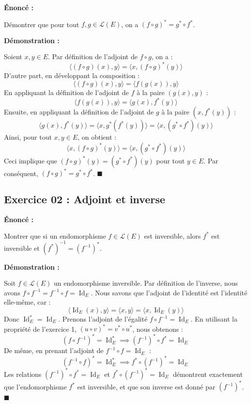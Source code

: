 \documentclass[11pt,a4paper]{article}
\begin{document}
\textbf{Énoncé :}


Démontrer que pour tout $f, g \in \mathcal{L}(E)$, on a $(f \circ g)^* = g^* \circ f^*$.

\textbf{Démonstration :}


Soient $x, y \in E$. Par définition de l'adjoint de $f \circ g$, on a :
$$ \langle (f \circ g)(x), y \rangle = \langle x, (f \circ g)^*(y) \rangle $$
D'autre part, en développant la composition :
$$ \langle (f \circ g)(x), y \rangle = \langle f(g(x)), y \rangle $$
En appliquant la définition de l'adjoint de $f$ à la paire $(g(x), y)$ :
$$ \langle f(g(x)), y \rangle = \langle g(x), f^*(y) \rangle $$
Ensuite, en appliquant la définition de l'adjoint de $g$ à la paire $(x, f^*(y))$ :
$$ \langle g(x), f^*(y) \rangle = \langle x, g^*(f^*(y)) \rangle = \langle x, (g^* \circ f^*)(y) \rangle $$
Ainsi, pour tout $x, y \in E$, on obtient :
$$ \langle x, (f \circ g)^*(y) \rangle = \langle x, (g^* \circ f^*)(y) \rangle $$
Ceci implique que $(f \circ g)^*(y) = (g^* \circ f^*)(y)$ pour tout $y \in E$.
Par conséquent, $(f \circ g)^* = g^* \circ f^*$. $\blacksquare$

\subsection*{Exercice 02 : Adjoint et inverse}


\textbf{Énoncé :}


Montrer que si un endomorphisme $f \in \mathcal{L}(E)$ est inversible, alors $f^*$ est inversible et $(f^*)^{-1} = (f^{-1})^*$.

\textbf{Démonstration :}


Soit $f \in \mathcal{L}(E)$ un endomorphisme inversible.
Par définition de l'inverse, nous avons $f \circ f^{-1} = f^{-1} \circ f = \operatorname{Id}_E$.
Nous savons que l'adjoint de l'identité est l'identité elle-même, car :
$$ \langle \operatorname{Id}_E(x), y \rangle = \langle x, y \rangle = \langle x, \operatorname{Id}_E(y) \rangle $$
Donc $\operatorname{Id}_E^* = \operatorname{Id}_E$.
Prenons l'adjoint de l'égalité $f \circ f^{-1} = \operatorname{Id}_E$. En utilisant la propriété de l'exercice 1, $(u \circ v)^* = v^* \circ u^*$, nous obtenons :
$$ (f \circ f^{-1})^* = \operatorname{Id}_E^* \implies (f^{-1})^* \circ f^* = \operatorname{Id}_E $$
De même, en prenant l'adjoint de $f^{-1} \circ f = \operatorname{Id}_E$ :
$$ (f^{-1} \circ f)^* = \operatorname{Id}_E^* \implies f^* \circ (f^{-1})^* = \operatorname{Id}_E $$
Les relations $(f^{-1})^* \circ f^* = \operatorname{Id}_E$ et $f^* \circ (f^{-1})^* = \operatorname{Id}_E$ démontrent exactement que l'endomorphisme $f^*$ est inversible, et que son inverse est donné par $(f^{-1})^*$. $\blacksquare$
\end{document}
